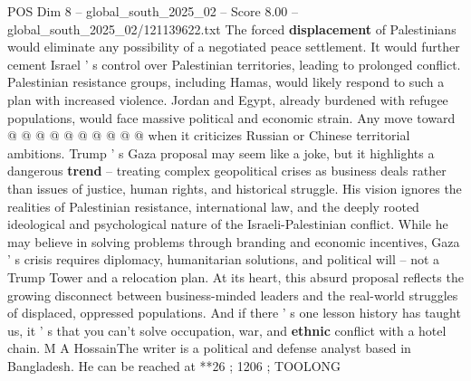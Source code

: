 \begin{textsample}{POS Dim 8 – global\_south\_2025\_02 – Score 8.00 – global\_south\_2025\_02/121139622.txt}
The forced \textbf{displacement} of Palestinians would eliminate any possibility of a negotiated peace settlement.
It would further cement Israel ' s control over Palestinian territories, leading to prolonged conflict.
Palestinian resistance groups, including Hamas, would likely respond to such a plan with increased violence.
Jordan and Egypt, already burdened with refugee populations, would face massive political and economic strain.
Any move toward @ @ @ @ @ @ @ @ @ @ when it criticizes Russian or Chinese territorial ambitions.
Trump ' s Gaza proposal may seem like a joke, but it highlights a dangerous \textbf{trend} -- treating complex geopolitical crises as business deals rather than issues of justice, human rights, and historical struggle.
His vision ignores the realities of Palestinian resistance, international law, and the deeply rooted ideological and psychological nature of the Israeli-Palestinian conflict.
While he may believe in solving problems through branding and economic incentives, Gaza ' s crisis requires diplomacy, humanitarian solutions, and political will -- not a Trump Tower and a relocation plan.
At its heart, this absurd proposal reflects the growing disconnect between business-minded leaders and the real-world struggles of displaced, oppressed populations.
And if there ' s one lesson history has taught us, it ' s that you can't solve occupation, war, and \textbf{ethnic} conflict with a hotel chain.
M A HossainThe writer is a political and defense analyst based in Bangladesh.
He can be reached at **26 ; 1206 ; TOOLONG

\end{textsample}
